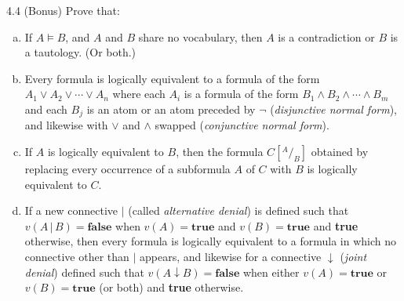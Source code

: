 \documentclass{article}
\begin{document}
\begin{prob}{4.4 (Bonus)}
    Prove that:
    \begin{enumerate}[a)]
    \item If $A \models B$, and $A$ and $B$ share no vocabulary, then $A$ is a contradiction or $B$ is a tautology. (Or both.)
    \item Every formula is logically equivalent to a formula of the form $A_1 \vee A_2 \vee \cdots \vee A_n$ where each $A_i$ is a formula of the form $B_1 \wedge B_2 \wedge \cdots \wedge B_m$ and each $B_j$ is an atom or an atom preceded by $\neg$ (\emph{disjunctive normal form}), and likewise with $\vee$ and $\wedge$ swapped (\emph{conjunctive normal form}).
    \item If $A$ is logically equivalent to $B$, then the formula $C\left[^{A} / _{B} \right]$ obtained by replacing every occurrence of a subformula $A$ of $C$ with $B$ is logically equivalent to $C$.
    \item If a new connective $|$ (called \textit{alternative denial}) is defined such that $v(A\,|\,B) = \mathbf{false}$ when $v(A) = \mathbf{true}$ and $v(B) = \mathbf{true}$ and \textbf{true} otherwise, then every formula is logically equivalent to a formula in which no connective other than $|$ appears, and likewise for a connective $\downarrow$ (\textit{joint denial}) defined such that $v(A \downarrow B) = \mathbf{false}$ when either $v(A) = \mathbf{true}$ or $v(B) = \mathbf{true}$ (or both) and \textbf{true} otherwise.
    \end{enumerate}
\end{prob}
\end{document}
